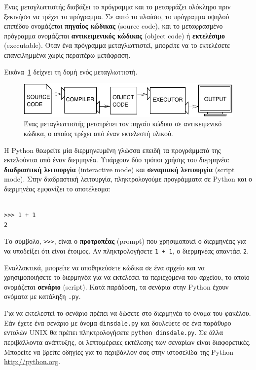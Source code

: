 \documentclass[10pt]{book}
\begin{document}
Ένας μεταγλωττιστής διαβάζει το πρόγραμμα και το μεταφράζει ολόκληρο
πριν ξεκινήσει να τρέχει το πρόγραμμα.  Σε αυτό το πλαίσιο, το
πρόγραμμα υψηλού επιπέδου ονομάζεται {\bf πηγαίος κώδικας} (source code), και το
μεταφρασμένο πρόγραμμα ονομάζεται {\bf αντικειμενικός κώδικας} (object code) ή {\bf εκτελέσιμο} (executable). Όταν ένα πρόγραμμα μεταγλωττιστεί, μπορείτε να το εκτελέσετε επανειλημμένα
χωρίς περαιτέρω μετάφραση.

Εικόνα~\ref{fig.compile} δείχνει τη δομή ενός μεταγλωττιστή.

\begin{figure}
\centerline
{\includegraphics[scale=0.9]{figs/compile.pdf}}
\caption{Ένας μεταγλωττιστής μετατρέπει τον πηγαίο κώδικα σε αντικειμενικό κώδικα, ο οποίος τρέχει από έναν εκτελεστή υλικού.}
\label{fig.compile}
\end{figure}

 Η  Python  θεωρείτε μία διερμηνευμένη γλώσσα επειδή τα προγράμματά της
εκτελούνται από έναν διερμηνέα.  Υπάρχουν δύο τρόποι χρήσης του διερμηνέα: {\bf διαδραστική λειτουργία} 
(interactive mode) και {\bf σεναριακή λειτουργία} (script mode).  Στην διαδραστική
λειτουργία, πληκτρολογούμε προγράμματα σε Python και ο διερμηνέας εμφανίζει το αποτέλεσμα:


\begin{verbatim}

>>> 1 + 1
2
\end{verbatim}
%
 Το σύμβολο, \verb">>>", είναι ο {\bf προτροπέας} (prompt) που χρησιμοποιεί ο διερμηνέας 
για να υποδείξει ότι είναι έτοιμος.  Αν πληκτρολογήσετε {\tt 1 + 1}, ο διερμηνέας απαντάει {\tt 2}.

Εναλλακτικά, μπορείτε να αποθηκεύσετε κώδικα σε ένα αρχείο και να χρησιμοποιήσετε
το διερμηνέα για να εκτελέσει τα περιεχόμενα του αρχείου, το οποίο ονομάζεται 
{\bf σενάριο} (script).  Κατά παράδοση, τα σενάρια στην Python έχουν ονόματα με
κατάληξη {\tt .py}.

Για να εκτελεστεί το σενάριο πρέπει να δώσετε στο διερμηνέα το όνομα
του φακέλου.  Εάν έχετε ένα σενάριο με όνομα {\tt dinsdale.py} 
και δουλεύετε σε ένα παράθυρο εντολών  UNIX θα πρέπει πληκτρολογήσετε 
{\tt python dinsdale.py}.  Σε άλλα περιβάλλοντα ανάπτυξης, οι λεπτομέρειες
εκτέλεσης των σεναρίων είναι διαφορετικές.  Μπορείτε να βρείτε οδηγίες για
το περιβάλλον σας στην ιστοσελίδα της  Python \url{http://python.org}.
\end{document}
